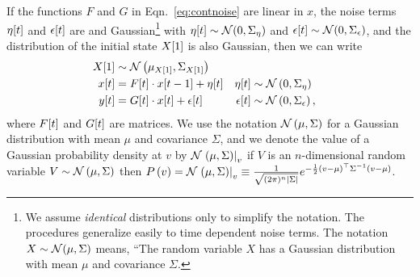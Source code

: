 If the functions $F$ and $G$ in Eqn.~\eqref{eq:contnoise} are linear
in $x$, the noise terms ${\eta}{[t]}$ and ${\epsilon}{[t]}$ are \iid
and Gaussian\footnote{We assume \emph{identical} distributions only to
  simplify the notation.  The procedures generalize easily to time
  dependent noise terms.  The notation $X\sim{\mathcal{N}}(\mu,\Sigma)$
  means, ``The random variable $X$ has a Gaussian distribution with
  mean $\mu$ and covariance $\Sigma$.} with ${\eta}{[t]} \sim
{\mathcal{N}}(0,\Sigma_\eta)$ and ${\epsilon}{[t]} \sim
{\mathcal{N}}(0,\Sigma_\epsilon)$, and the distribution of the initial state
${X}{[1]}$ is also Gaussian, then we can write
\begin{subequations}
  \label{eq:LinearG}
  \begin{align}
  {X}{[1]} & \sim {\mathcal{N}}\left(\mu_{{X}{[1]}},\Sigma_{{X}{[1]}}
  \right)\\
  {x}{[t]} &= {F}{[t]} \cdot {x}{[t-1]} + {\eta}{[t]} &
  {\eta}{[t]} &\sim {\mathcal{N}}\left( 0, \Sigma_\eta \right) \\
  {y}{[t]} &= {G}{[t]} \cdot {x}{[t]} + {\epsilon}{[t]} &
  {\epsilon}{[t]} &\sim {\mathcal{N}}\left( 0, \Sigma_\epsilon \right),
  \end{align}
\end{subequations}
where ${F}{[t]}$ and ${G}{[t]}$ are matrices.  We use the notation
${\mathcal{N}}\left( \mu, \Sigma \right)$ for a Gaussian distribution with
mean $\mu$ and covariance $\Sigma$, and we denote the value of a
Gaussian probability density at $v$ by ${\mathcal{N}}\left.\left(\mu,\Sigma\right)\right|_{v}$ \ie
if $V$ is an $n$-dimensional random variable $V \sim {\mathcal{N}}\left( \mu,
  \Sigma \right)$ then $ P\left(v \right) = {\mathcal{N}}\left.\left(\mu,\Sigma\right)\right|_{v}
\equiv \frac{1}{\sqrt{(2\pi)^n \left|\Sigma\right|}} e^{-\frac{1}{2}
  (v-\mu)^\top \Sigma^{-1} (v-\mu)}$.

